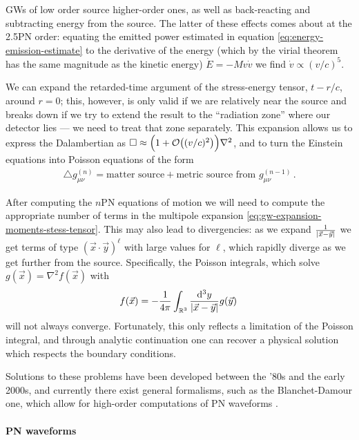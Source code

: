 \documentclass[main.tex]{subfiles}
\begin{document}
\acsp{GW} of low order source higher-order ones, as well as back-reacting and subtracting energy from the source. 
The latter of these effects comes about at the 2.5PN order: equating the emitted power estimated in equation \eqref{eq:energy-emission-estimate} to the derivative of the energy (which by the virial theorem has the same magnitude as the kinetic energy) \(\dot{E} = - M v \dot{v}\) we find  \(\dot{v} \propto (v/c)^{5}\). 

We can expand the retarded-time argument of the stress-energy tensor, \(t - r/c\), around \(r = 0\); this, however, is only valid if we are relatively near the source and breaks down if we try to extend the result to the ``radiation zone'' where our detector lies --- we need to treat that zone separately. 
This expansion allows us to express the Dalambertian as \(\square \approx \qty(1 + \order{(v/c)^2}) \nabla^2\), and to turn the Einstein equations into Poisson equations of the form 
%
\begin{align}
\triangle g_{\mu \nu }^{(n)} = \text{matter source} + \text{metric source from \(g_{\mu \nu}^{(n-1)}\)}
\,.
\end{align}

After computing the \(n\)PN equations of motion we will need to compute the appropriate number of terms in the multipole expansion \eqref{eq:gw-expansion-moments-stess-tensor}. 
This may also lead to divergencies: as we expand \( \frac{1}{\abs{\vec{x} - \vec{y}}}\) we get terms of type \((\vec{x} \cdot \vec{y} )^{\ell}\) with large values for \(\ell\), which rapidly diverge as we get further from the source. 
Specifically, the Poisson integrals, which solve \(g(\vec{x}) = \nabla^2 f(\vec{x})\) with 
%
\begin{align}
f(\vec{x}) = - \frac{1}{4 \pi } \int_{\mathbb{R}^3} \frac{ \dd[3]{y}}{\abs{\vec{x} - \vec{y}}} g(\vec{y})
\,
\end{align}
%
will not always converge.
Fortunately, this only reflects a limitation of the Poisson integral, and through analytic continuation one can recover a physical solution which respects the boundary conditions. 

Solutions to these problems have been developed between the '80s and the early 2000s, and currently there exist general formalisms, such as the Blanchet-Damour one, which allow for high-order computations of \ac{PN} waveforms \cite{blanchetGravitationalRadiationPostNewtonian2014}.

\paragraph{\ac{PN} waveforms}
\end{document}
